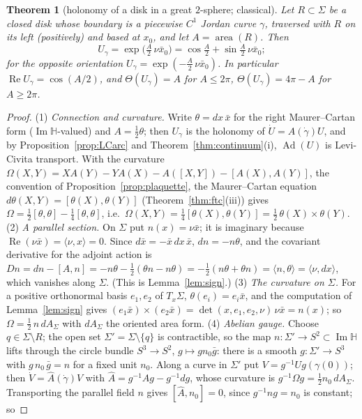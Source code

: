 \documentclass[11pt,reqno]{amsart}
\newtheorem{theorem}{Theorem}[section]
\theoremstyle{definition}
\theoremstyle{remark}
\numberwithin{equation}{section}
\newcommand{\HH}{\mathbb{H}}
\newcommand{\Ad}{\operatorname{Ad}}
\newcommand{\re}{\operatorname{Re}}
\newcommand{\im}{\operatorname{Im}}
\newcommand{\ip}[2]{\langle #1,#2\rangle}
\begin{document}
\begin{theorem}[holonomy of a disk in a great $2$-sphere; classical]\label{thm:disk}
Let $R\subset\Sigma$ be a closed disk whose boundary is a piecewise $C^1$ Jordan curve $\gamma$, traversed with $R$ on its left
(positively) and based at $x_0$, and let $A=\operatorname{area}(R)$.  Then
\[
U_\gamma=\exp\bigl(\tfrac A2\,\nu\bar x_0\bigr)=\cos\tfrac A2+\sin\tfrac A2\,\nu\bar x_0 ;
\]
for the opposite orientation $U_\gamma=\exp(-\tfrac A2\,\nu\bar x_0)$.  In particular $\re U_\gamma=\cos(A/2)$, and $\Theta(U_\gamma)=A$ for
$A\le2\pi$, $\Theta(U_\gamma)=4\pi-A$ for $A\ge2\pi$.
\end{theorem}
\begin{proof}
(1) \emph{Connection and curvature.}  Write $\theta=dx\,\bar x$ for the right Maurer--Cartan form ($\im\HH$-valued) and $A=\tfrac12\theta$;
then $U_\gamma$ is the holonomy of $\dot U=A(\dot\gamma)U$, and by Proposition~\ref{prop:LCarc} and Theorem~\ref{thm:continuum}(i),
$\Ad(U)$ is Levi-Civita transport.  With the curvature $\Omega(X,Y)=X A(Y)-YA(X)-A([X,Y])-[A(X),A(Y)]$, the convention of
Proposition~\ref{prop:plaquette}, the Maurer--Cartan equation $d\theta(X,Y)=[\theta(X),\theta(Y)]$ (Theorem~\ref{thm:ftc}(iii)) gives
$\Omega=\tfrac12[\theta,\theta]-\tfrac14[\theta,\theta]$, i.e.\ $\Omega(X,Y)=\tfrac14[\theta(X),\theta(Y)]=\tfrac12\,\theta(X)\times\theta(Y)$.
(2) \emph{A parallel section.}  On $\Sigma$ put $n(x)=\nu\bar x$; it is imaginary because $\re(\nu\bar x)=\ip\nu x=0$.  Since
$d\bar x=-\bar x\,dx\,\bar x$, $dn=-n\theta$, and the covariant derivative for the adjoint action is
$Dn=dn-[A,n]=-n\theta-\tfrac12(\theta n-n\theta)=-\tfrac12(n\theta+\theta n)=\ip n\theta=\ip\nu{dx}$, which vanishes along $\Sigma$.  (This is
Lemma~\ref{lem:sign}.)  (3) \emph{The curvature on $\Sigma$.}  For a positive orthonormal basis $e_1,e_2$ of $T_x\Sigma$,
$\theta(e_i)=e_i\bar x$, and the computation of Lemma~\ref{lem:sign} gives $(e_1\bar x)\times(e_2\bar x)=\det(x,e_1,e_2,\nu)\,\nu\bar x=n(x)$;
so $\Omega=\tfrac12\,n\,dA_\Sigma$ with $dA_\Sigma$ the oriented area form.  (4) \emph{Abelian gauge.}  Choose $q\in\Sigma\setminus R$; the open set
$\Sigma'=\Sigma\setminus\{q\}$ is contractible, so the map $n\colon\Sigma'\to S^2\subset\im\HH$ lifts through the circle bundle
$S^3\to S^2$, $g\mapsto gn_0\bar g$: there is a smooth $g\colon\Sigma'\to S^3$ with $g\,n_0\,\bar g=n$ for a fixed unit $n_0$.  Along a curve in
$\Sigma'$ put $V=g^{-1}Ug(\gamma(0))$; then $\dot V=\hat A(\dot\gamma)V$ with $\hat A=g^{-1}Ag-g^{-1}dg$, whose curvature is
$g^{-1}\Omega g=\tfrac12n_0\,dA_\Sigma$.  Transporting the parallel field $n$ gives $[\hat A,n_0]=0$, since $g^{-1}ng=n_0$ is constant; so

\end{proof}
\end{document}
